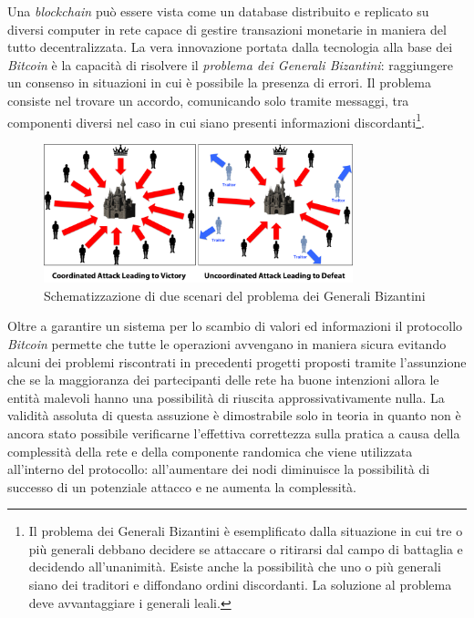 Una \textit{blockchain} può essere vista come un database distribuito e replicato su diversi computer in rete capace di gestire transazioni monetarie in maniera del tutto decentralizzata.\newline\newline
La vera innovazione portata dalla tecnologia alla base dei \textit{Bitcoin} è la capacità di risolvere il \textit{problema dei Generali Bizantini}: raggiungere un consenso in situazioni in cui è possibile la presenza di errori.\newline
Il problema consiste nel trovare un accordo, comunicando solo tramite messaggi, tra componenti diversi nel caso in cui siano presenti informazioni discordanti\footnote{Il problema dei Generali Bizantini è esemplificato dalla situazione in cui tre o più generali debbano decidere se attaccare o ritirarsi dal campo di battaglia e decidendo all'unanimità. Esiste anche la possibilità che uno o più generali siano dei traditori e diffondano ordini discordanti. La soluzione al problema deve avvantaggiare i generali leali.}.\newline
\begin{figure}
    \centering
    \includegraphics[width=0.8\textwidth]{images/byzantine.png}
    \caption{Schematizzazione di due scenari del problema dei Generali Bizantini}
\end{figure}
Oltre a garantire un sistema per lo scambio di valori ed informazioni il protocollo \textit{Bitcoin} permette che tutte le operazioni avvengano in maniera sicura evitando alcuni dei problemi riscontrati in precedenti progetti proposti tramite l'assunzione che se la maggioranza dei partecipanti delle rete ha buone intenzioni allora le entità malevoli hanno una possibilità di riuscita approssivativamente nulla.\newline
La validità assoluta di questa assuzione è dimostrabile solo in teoria in quanto non è ancora stato possibile verificarne l'effettiva correttezza sulla pratica a causa della complessità della rete e della componente randomica che viene utilizzata all'interno del protocollo: all'aumentare dei nodi diminuisce la possibilità di successo di un potenziale attacco e ne aumenta la complessità.\newline
